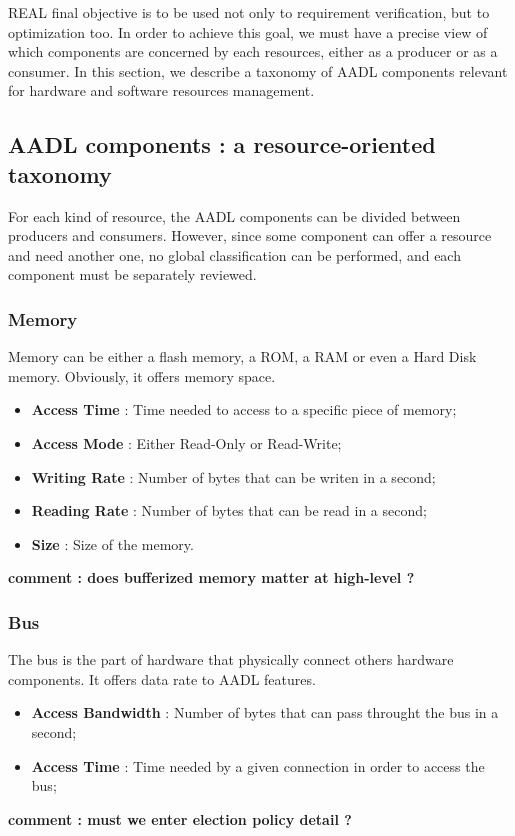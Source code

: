 \label {aadl_resources}

REAL final objective is to be used not only to requirement 
verification, but to optimization too. In order to achieve 
this goal, we must have a precise view of which components 
are concerned by each resources, either as a producer or as 
a consumer. In this section, we describe a taxonomy of AADL 
components relevant for hardware and software resources 
management.

\subsection {AADL components : a resource-oriented taxonomy}

For each kind of resource, the AADL components can be divided 
between producers and consumers. However, since some component 
can offer a resource and need another one, no global 
classification can be performed, and each component must be 
separately reviewed.

\subsubsection {Memory}

Memory can be either a flash memory, a ROM, a RAM or even a Hard 
Disk memory. Obviously, it offers memory space. 

\begin{itemize}
\item \textbf{Access Time} : Time needed to access to a specific 
piece of memory;
\item \textbf{Access Mode} : Either Read-Only or Read-Write;
\item \textbf{Writing Rate} : Number of bytes that can be writen 
in a second;
\item \textbf{Reading Rate} : Number of bytes that can be read in 
a second;
\item \textbf{Size} : Size of the memory.
\end{itemize}
\textbf{comment : does bufferized memory matter at high-level ?}

\subsubsection {Bus}

The bus is the part of hardware that physically connect others 
hardware components. It offers data rate to AADL features.

\begin{itemize}
\item \textbf{Access Bandwidth} : Number of bytes that can pass 
throught the bus in a second;
\item \textbf{Access Time} : Time needed by a given connection 
in order to access the bus;
\end{itemize}
\textbf{comment : must we enter election policy detail ?}

